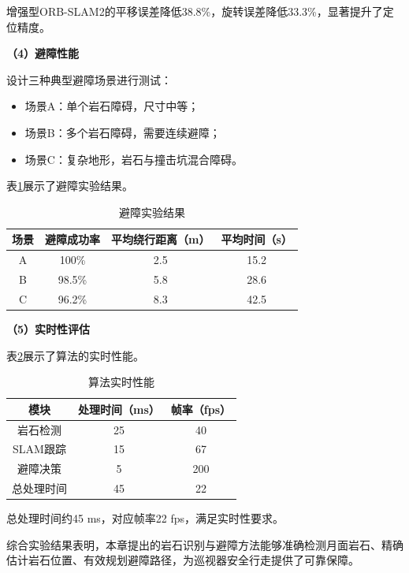 增强型ORB-SLAM2的平移误差降低38.8\%，旋转误差降低33.3\%，显著提升了定位精度。

\textbf{（4）避障性能}

设计三种典型避障场景进行测试：
\begin{itemize}
    \item 场景A：单个岩石障碍，尺寸中等；
    \item 场景B：多个岩石障碍，需要连续避障；
    \item 场景C：复杂地形，岩石与撞击坑混合障碍。
\end{itemize}

表\ref{tab:avoidance_result}展示了避障实验结果。

\begin{table}[htbp]
    \centering
    \caption{避障实验结果}
    \label{tab:avoidance_result}
    \begin{tabular}{cccc}
        \toprule
        场景 & 避障成功率 & 平均绕行距离（m） & 平均时间（s） \\
        \midrule
        A & 100\% & 2.5 & 15.2 \\
        B & 98.5\% & 5.8 & 28.6 \\
        C & 96.2\% & 8.3 & 42.5 \\
        \bottomrule
    \end{tabular}
\end{table}

\textbf{（5）实时性评估}

表\ref{tab:realtime_ch5}展示了算法的实时性能。

\begin{table}[htbp]
    \centering
    \caption{算法实时性能}
    \label{tab:realtime_ch5}
    \begin{tabular}{ccc}
        \toprule
        模块 & 处理时间（ms） & 帧率（fps） \\
        \midrule
        岩石检测 & 25 & 40 \\
        SLAM跟踪 & 15 & 67 \\
        避障决策 & 5 & 200 \\
        总处理时间 & 45 & 22 \\
        \bottomrule
    \end{tabular}
\end{table}

总处理时间约45 ms，对应帧率22 fps，满足实时性要求。

综合实验结果表明，本章提出的岩石识别与避障方法能够准确检测月面岩石、精确估计岩石位置、有效规划避障路径，为巡视器安全行走提供了可靠保障。
